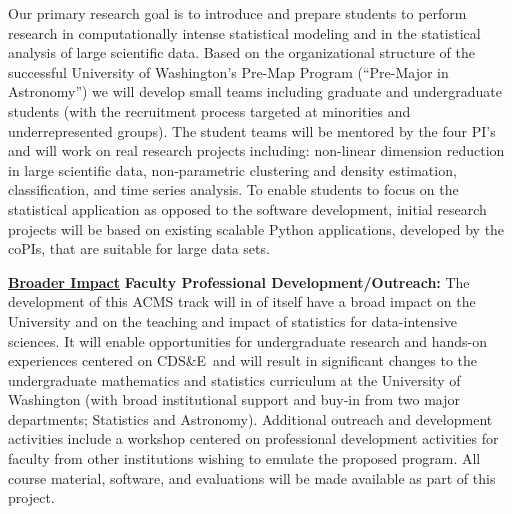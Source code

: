 \documentclass[nofootbib,floatfix,11pt]{article}
\newcommand{\cdse}{CDS\&E}
\begin{document}

Our primary research goal is to introduce and prepare students to
perform research in computationally intense statistical modeling and
in the statistical analysis of large scientific data. Based on the
organizational structure of the successful University of Washington's
Pre-Map Program (``Pre-Major in Astronomy'') we will develop small
teams including graduate and undergraduate students (with the
recruitment process targeted at minorities and underrepresented
groups).  The student teams will be mentored by the four PI's and will
work on real research projects including: non-linear dimension
reduction in large scientific data, non-parametric clustering and
density estimation, classification, and time series analysis. To
enable students to focus on the statistical application as opposed to
the software development, initial research projects will be based on
existing scalable Python applications, developed by the coPIs, that
are suitable for large data sets.

\noindent\underline{{\bf Broader Impact}} {\bf  Faculty Professional Development/Outreach:}
The development of this ACMS track will in of itself have a
broad impact on the University and on the teaching and impact of
statistics for data-intensive sciences. It will enable opportunities
for undergraduate research and hands-on experiences centered on \cdse\
and will result in significant changes to the undergraduate
mathematics and statistics curriculum at the University of Washington
(with broad institutional support and buy-in from two major
departments; Statistics and Astronomy). Additional outreach and
development activities include a workshop centered on professional
development activities for faculty from other institutions wishing to
emulate the proposed program. All course material, software, and
evaluations will be made available as part of this project. 
\end{document}
